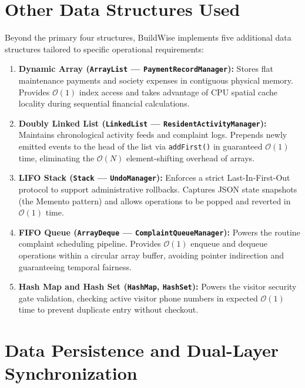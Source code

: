 \documentclass[12pt,a4paper]{article}
\begin{document}
\section{Other Data Structures Used}

Beyond the primary four structures, BuildWise implements five additional data structures tailored to specific operational requirements:

\begin{enumerate}[leftmargin=1.5em]
    \item \textbf{Dynamic Array (\texttt{ArrayList} --- \texttt{PaymentRecordManager}):}
    Stores flat maintenance payments and society expenses in contiguous physical memory. Provides $\mathcal{O}(1)$ index access and takes advantage of CPU spatial cache locality during sequential financial calculations.
    
    \item \textbf{Doubly Linked List (\texttt{LinkedList} --- \texttt{ResidentActivityManager}):}
    Maintains chronological activity feeds and complaint logs. Prepends newly emitted events to the head of the list via \texttt{addFirst()} in guaranteed $\mathcal{O}(1)$ time, eliminating the $\mathcal{O}(N)$ element-shifting overhead of arrays.
    
    \item \textbf{LIFO Stack (\texttt{Stack} --- \texttt{UndoManager}):}
    Enforces a strict Last-In-First-Out protocol to support administrative rollbacks. Captures JSON state snapshots (the Memento pattern) and allows operations to be popped and reverted in $\mathcal{O}(1)$ time.
    
    \item \textbf{FIFO Queue (\texttt{ArrayDeque} --- \texttt{ComplaintQueueManager}):}
    Powers the routine complaint scheduling pipeline. Provides $\mathcal{O}(1)$ enqueue and dequeue operations within a circular array buffer, avoiding pointer indirection and guaranteeing temporal fairness.
    
    \item \textbf{Hash Map and Hash Set (\texttt{HashMap}, \texttt{HashSet}):}
    Powers the visitor security gate validation, checking active visitor phone numbers in expected $\mathcal{O}(1)$ time to prevent duplicate entry without checkout.
\end{enumerate}

\section{Data Persistence and Dual-Layer Synchronization}
\end{document}
